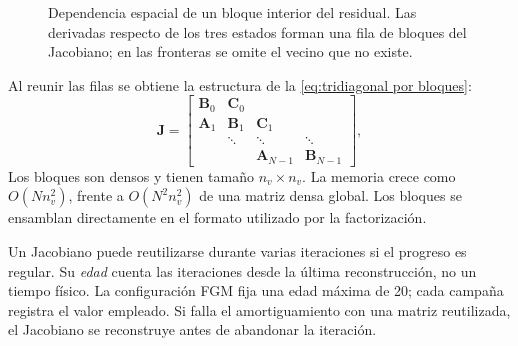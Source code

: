 \documentclass[12pt,a4paper,twoside,openany]{book}
\newcommand{\vect}[1]{\bm{#1}}
\newcommand{\mat}[1]{\bm{#1}}
\begin{document}
\begin{figure}[htbp]
\centering
{}
\caption{Dependencia espacial de un bloque interior del residual.
Las derivadas respecto de los tres estados forman una fila de bloques del
Jacobiano; en las fronteras se omite el vecino que no existe.}
\label{fig:jacobian-stencil}
\end{figure}

Al reunir las filas se obtiene la estructura de la
\cref{eq:tridiagonal por bloques}:
\begin{equation}
  \mat{J}=
  \begin{bmatrix}
    \mat{B}_0 & \mat{C}_0 & & \\
    \mat{A}_1 & \mat{B}_1 & \mat{C}_1 & \\
    & \ddots & \ddots & \ddots\\
    & & \mat{A}_{N-1} & \mat{B}_{N-1}
  \end{bmatrix},
  \label{eq:tridiagonal por bloques}
\end{equation}
Los bloques son densos y tienen tamaño \(n_v\times n_v\). La memoria crece como
\(O(Nn_v^2)\), frente a \(O(N^2n_v^2)\) de una matriz densa global. Los bloques
se ensamblan directamente en el formato utilizado por la factorización.

Un Jacobiano puede reutilizarse durante varias iteraciones si el progreso es
regular. Su \emph{edad} cuenta las iteraciones desde la última reconstrucción,
no un tiempo físico. La configuración FGM fija una edad máxima de 20;
cada campaña registra el valor empleado. Si falla el
amortiguamiento con una matriz reutilizada, el Jacobiano se reconstruye antes de
abandonar la iteración.
\end{document}

